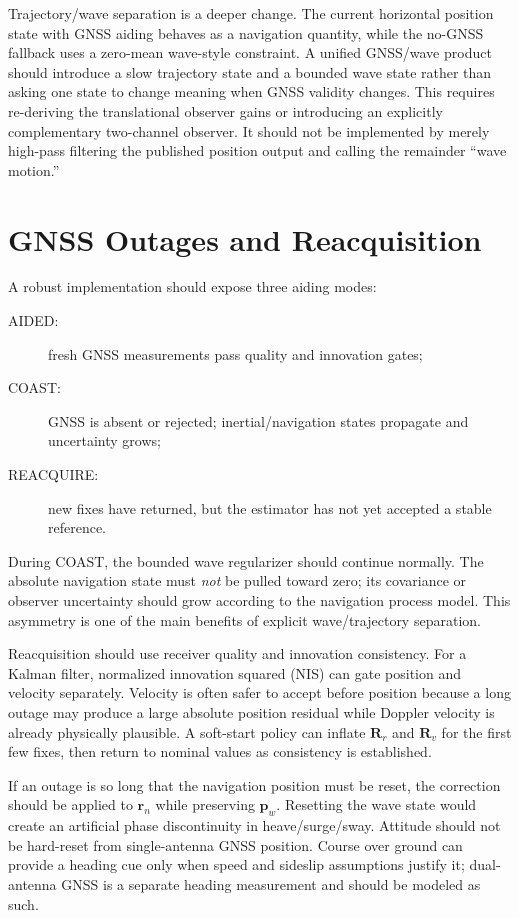 \documentclass[conference]{IEEEtran}
\DeclareRobustCommand{\vct}[1]{\bm{#1}}
\DeclareRobustCommand{\mat}[1]{\bm{#1}}
\begin{document}
Trajectory/wave separation is a deeper change.  The current horizontal position state
with GNSS aiding behaves as a navigation quantity, while the no-GNSS fallback uses a
zero-mean wave-style constraint.  A unified GNSS/wave product should introduce a slow
trajectory state and a bounded wave state rather than asking one state to change
meaning when GNSS validity changes.  This requires re-deriving the translational
observer gains or introducing an explicitly complementary two-channel observer.  It
should not be implemented by merely high-pass filtering the published position output
and calling the remainder ``wave motion.''

\section{GNSS Outages and Reacquisition}
\label{sec:outages}

A robust implementation should expose three aiding modes:
\begin{description}
  \item[AIDED:] fresh GNSS measurements pass quality and innovation gates;
  \item[COAST:] GNSS is absent or rejected; inertial/navigation states propagate and
  uncertainty grows;
  \item[REACQUIRE:] new fixes have returned, but the estimator has not yet accepted a
  stable reference.
\end{description}

During COAST, the bounded wave regularizer should continue normally.  The absolute
navigation state must \emph{not} be pulled toward zero; its covariance or observer
uncertainty should grow according to the navigation process model.  This asymmetry is
one of the main benefits of explicit wave/trajectory separation.

Reacquisition should use receiver quality and innovation consistency.  For a Kalman
filter, normalized innovation squared (NIS) can gate position and velocity separately.
Velocity is often safer to accept before position because a long outage may produce a
large absolute position residual while Doppler velocity is already physically
plausible.  A soft-start policy can inflate $\mat R_r$ and $\mat R_v$ for the first few
fixes, then return to nominal values as consistency is established.

If an outage is so long that the navigation position must be reset, the correction
should be applied to $\vct r_n$ while preserving $\vct p_w$.  Resetting the wave state
would create an artificial phase discontinuity in heave/surge/sway.  Attitude should
not be hard-reset from single-antenna GNSS position.  Course over ground can provide a
heading cue only when speed and sideslip assumptions justify it; dual-antenna GNSS is
a separate heading measurement and should be modeled as such.
\end{document}
